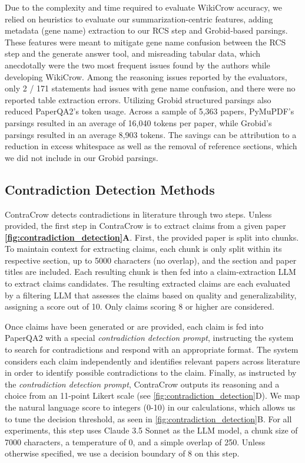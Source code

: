 \documentclass{article}
\begin{document}
Due to the complexity and time required to evaluate WikiCrow accuracy, we relied on heuristics to evaluate our summarization-centric features, adding metadata (gene name) extraction to our RCS step and Grobid-based parsings. These features were meant to mitigate gene name confusion between the RCS step and the generate answer tool, and misreading tabular data, which anecdotally were the two most frequent issues found by the authors while developing WikiCrow. Among the reasoning issues reported by the evaluators, only 2 / 171 statements had issues with gene name confusion, and there were no reported table extraction errors. Utilizing Grobid structured parsings also reduced PaperQA2's token usage. Across a sample of 5,363 papers, PyMuPDF's parsings resulted in an average of 16,040 tokens per paper, while Grobid's parsings resulted in an average 8,903 tokens. The savings can be attribution to a reduction in excess whitespace as well as the removal of reference sections, which we did not include in our Grobid parsings.

\subsection{Contradiction Detection Methods}  \label{sec:cc-methods}
ContraCrow detects contradictions in literature through two steps. Unless provided, the first step in ContraCrow is to extract claims from a given paper \textbf{\autoref{fig:contradiction_detection}A}. First, the provided paper is split into chunks. To maintain context for extracting claims, each chunk is only split within its respective section, up to 5000 characters (no overlap), and the section and paper titles are included. Each resulting chunk is then fed into a claim-extraction LLM to extract claims candidates. The resulting extracted claims are each evaluated by a filtering LLM that assesses the claims based on quality and generalizability, assigning a score out of 10. Only claims scoring 8 or higher are considered. 

Once claims have been generated or are provided, each claim is fed into PaperQA2 with a special \textit{contradiction detection prompt}, instructing the system to search for contradictions and respond with an appropriate format. The system considers each claim independently and identifies relevant papers across literature in order to identify possible contradictions to the claim. Finally, as instructed by the \textit{contradiction detection prompt}, ContraCrow outputs its reasoning and a choice from an 11-point Likert scale (see \autoref{fig:contradiction_detection}D). We map the natural language score to integers (0-10) in our calculations, which allows us to tune the decision threshold, as seen in \ref{fig:contradiction_detection}B. For all experiments, this step uses Claude 3.5 Sonnet \cite{claude2024} as the LLM model, a chunk size of 7000 characters, a temperature of 0, and a simple overlap of 250. Unless otherwise specified, we use a decision boundary of $8$ on this step. 
\end{document}
